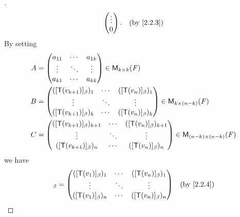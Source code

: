 \begin{proof}[]
\begin{align*}
\begin{pmatrix}
			                                                                                                             \vdots  \\
			                                                                                                             0
		                                                                                                             \end{pmatrix}. &  & \by{2.2.3}
	\end{align*}
	By setting
	\begin{align*}
		A & = \begin{pmatrix}
			      a_{1 1} & \cdots & a_{1 k} \\
			      \vdots  & \ddots & \vdots  \\
			      a_{k 1} & \cdots & a_{k k}
		      \end{pmatrix} \in \ms[k][k][\F]                                                                    \\
		B & = \begin{pmatrix}
			      ([\T(v_{k + 1})]_{\beta})_1 & \cdots & ([\T(v_n)]_{\beta})_1 \\
			      \vdots                      & \ddots & \vdots                \\
			      ([\T(v_{k + 1})]_{\beta})_k & \cdots & ([\T(v_n)]_{\beta})_k
		      \end{pmatrix} \in \ms[k][(n - k)][\F]             \\
		C & = \begin{pmatrix}
			      ([\T(v_{k + 1})]_{\beta})_{k + 1} & \cdots & ([\T(v_n)]_{\beta})_{k + 1} \\
			      \vdots                            & \ddots & \vdots                      \\
			      ([\T(v_{k + 1})]_{\beta})_n       & \cdots & ([\T(v_n)]_{\beta})_n
		      \end{pmatrix} \in \ms[(n - k)][(n - k)][\F]
	\end{align*}
	we have
	\begin{align*}
		[\T]_{\beta} & = \begin{pmatrix}
			                 ([\T(v_1)]_{\beta})_1 & \cdots & ([\T(v_n)]_{\beta})_1   \\
			                 \vdots                & \ddots & \vdots                  \\
			                 ([\T(v_1)]_{\beta})_n & \cdots & ([\T(v_n)]_{\beta})_{n}
		                 \end{pmatrix}                                        &  & \by{2.2.4}                                        \\

\end{align*}
\end{proof}
